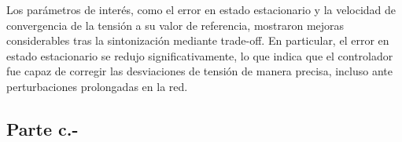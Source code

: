 Los parámetros de interés, como el error en estado estacionario y la velocidad de convergencia de la tensión a su valor de referencia, mostraron mejoras considerables tras la sintonización mediante trade-off. En particular, el error en estado estacionario se redujo significativamente, lo que indica que el controlador fue capaz de corregir las desviaciones de tensión de manera precisa, incluso ante perturbaciones prolongadas en la red.

\subsection{Parte c.-}






